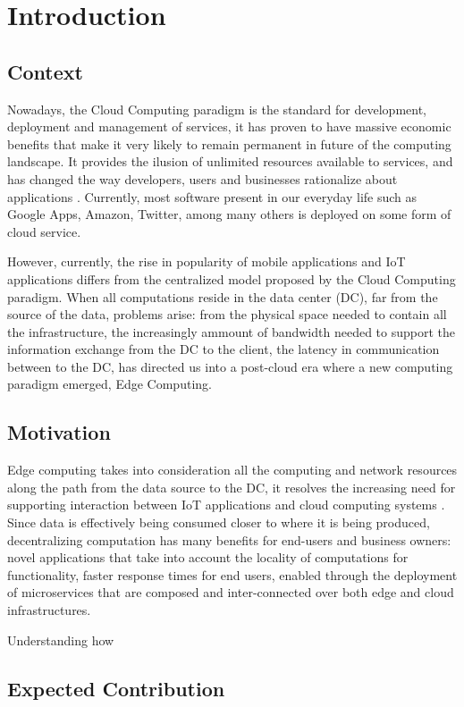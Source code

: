 \newcommand{\novathesis}{\emph{novathesis}}
\newcommand{\novathesisclass}{\texttt{novathesis.cls}}


\chapter{Introduction}
\label{cha:introduction}

\section{Context}

Nowadays, the Cloud Computing paradigm is the standard for development, deployment and management of services, 
it has proven to have massive economic benefits that make it very likely to remain permanent in future of the 
computing landscape. It provides the ilusion of unlimited resources available to services, and has changed the 
way developers, users and businesses rationalize about  applications \cite{Armbrust:2010:VCC:1721654.1721672}.
Currently, most software present in our everyday life such as Google Apps,
Amazon, Twitter, among many others is deployed on some form of cloud service. 

However, currently, the rise in popularity of mobile applications and IoT applications differs from 
the centralized model proposed by the Cloud Computing paradigm.
When all computations reside in the data center (DC), far from the source of the data, 
problems arise: from the physical space needed to contain all the infrastructure,
the increasingly ammount of bandwidth needed to support the information exchange from the DC to the client,
the latency in communication between to the DC, has directed us
 into a post-cloud era where a new computing paradigm emerged, Edge Computing. 

\section{Motivation}

Edge computing takes into consideration all the computing and network resources along
the path from the data source to the DC, it resolves the increasing need for supporting interaction
 between IoT applications and cloud computing systems \cite{iot_journal_shi_weisong_and_cao}.
 Since data is effectively being consumed closer to where it is being produced,
decentralizing computation has many benefits for end-users and business owners:
 novel applications that take into account the locality of computations for functionality,
 faster response times for end users, enabled through the deployment of microservices 
 that are composed and inter-connected over both edge and cloud infrastructures.

 Understanding how 

\section{Expected Contribution}




